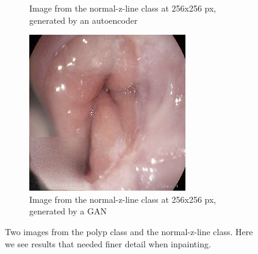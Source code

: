 \begin{figure}
\begin{subfigure}[t]{0.4\textwidth}
            \caption{Image from the normal-z-line class at 256x256 px, generated by an autoencoder}    
            \label{fig:z_AE_SQUARE1}
        \end{subfigure}
        \qquad%
        \begin{subfigure}[t]{0.4\textwidth}   
            \centering 
            \includegraphics[width=\textwidth]{experiments/figures/greensquare/zGAN.png}
            \caption{Image from the normal-z-line class at 256x256 px, generated by a GAN }    
            \label{fig:z_GAN_SQUARE1}
        \end{subfigure}
        \caption{Two images from the polyp class and the normal-z-line class. Here we see results that needed finer detail when inpainting.} 
        \label{fig:AE_GAN_SQUARE1}
    \end{figure}
    
